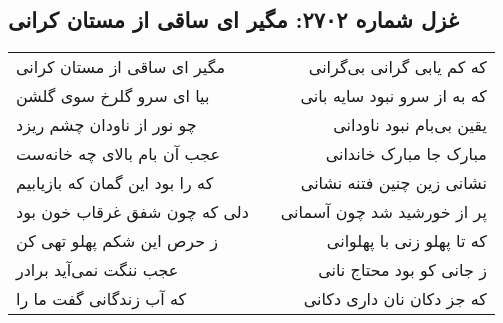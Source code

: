 \begin{center}
\section*{غزل شماره ۲۷۰۲: مگیر ای ساقی از مستان کرانی}
\label{sec:2702}
\begin{longtable}{l p{0.5cm} r}
مگیر ای ساقی از مستان کرانی
&&
که کم یابی گرانی بی‌گرانی
\\
بیا ای سرو گلرخ سوی گلشن
&&
که به از سرو نبود سایه بانی
\\
چو نور از ناودان چشم ریزد
&&
یقین بی‌بام نبود ناودانی
\\
عجب آن بام بالای چه خانه‌ست
&&
مبارک جا مبارک خاندانی
\\
که را بود این گمان که بازیابیم
&&
نشانی زین چنین فتنه نشانی
\\
دلی که چون شفق غرقاب خون بود
&&
پر از خورشید شد چون آسمانی
\\
ز حرص این شکم پهلو تهی کن
&&
که تا پهلو زنی با پهلوانی
\\
عجب ننگت نمی‌آید برادر
&&
ز جانی کو بود محتاج نانی
\\
که آب زندگانی گفت ما را
&&
که جز دکان نان داری دکانی
\\
\end{longtable}
\end{center}
